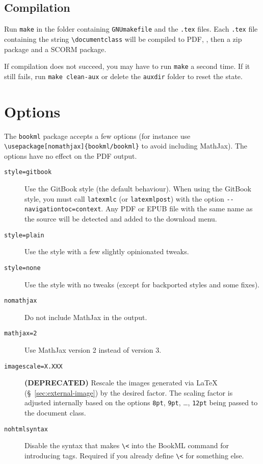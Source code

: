 \documentclass[a4paper,british]{article}
\def\ltxinline{\lstinline[style=bookml]}
\begin{document}
\subsection{Compilation}

Run \ltxinline|make| in the folder containing \texttt{GNUmakefile} and the \texttt{.tex} files. Each \texttt{.tex} file containing the string \ltxinline|\documentclass| will be compiled to PDF, \HTML{}, then a zip package and a SCORM package.

If compilation does not succeed, you may have to run \ltxinline|make| a second time. If it still fails, run \ltxinline|make clean-aux| or delete the \texttt{auxdir} folder to reset the state.

\section{Options}

The \ltxinline|bookml| package accepts a few options (for instance use \ltxinline|\usepackage[nomathjax]{bookml/bookml}| to avoid including MathJax). The options have no effect on the PDF output.

\begin{description}
  \item[\texttt{style=gitbook}] Use the GitBook style (the default behaviour). When using the GitBook style, you must call \ltxinline|latexmlc| (or \ltxinline|latexmlpost|) with the option \ltxinline|--navigationtoc=context|. Any PDF or EPUB file with the same name as the source will be detected and added to the download menu.
  \item[\texttt{style=plain}] Use the \LaTeXML{} style with a few slightly opinionated tweaks.
  \item[\texttt{style=none}] Use the \LaTeXML{} style with no tweaks (except for backported styles and some fixes).
  \item[\texttt{nomathjax}] Do not include MathJax in the output.
  \item[\texttt{mathjax=2}] Use MathJax version 2 instead of version 3.
  \item[\texttt{imagescale=X.XXX}] \textbf{(DEPRECATED)} Rescale the images generated via \LaTeX{} (\S~\ref{sec:external-image}) by the desired factor. The scaling factor is adjusted internally based on the options \ltxinline|8pt|, \ltxinline|9pt|, \dots, \ltxinline|12pt| being passed to the document class.
  \item[\texttt{nohtmlsyntax}] Disable the \HTML{} syntax that makes \ltxinline|\<| into the BookML command for introducing \HTML{} tags. Required if you already define \ltxinline|\<| for something else.
\end{description}
\end{document}
